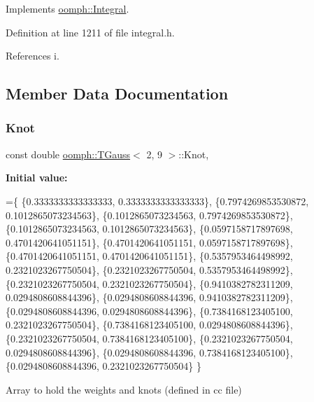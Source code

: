 Implements \hyperlink{classoomph_1_1Integral_ac65335e2aab120b285b3d6c294507b06}{oomph\+::\+Integral}.



Definition at line 1211 of file integral.\+h.



References i.



\subsection{Member Data Documentation}
\mbox{\label{classoomph_1_1TGauss_3_012_00_019_01_4_a65f7297373f3c25ff0616fde13fb4d65}} 
\subsubsection{\texorpdfstring{Knot}{Knot}}
{\footnotesize\ttfamily const double \hyperlink{classoomph_1_1TGauss}{oomph\+::\+T\+Gauss}$<$ 2, 9 $>$\+::Knot\hspace{0.3cm}{\ttfamily [static]}, {\ttfamily [private]}}

{\bfseries Initial value\+:}
\begin{DoxyCode}
=\{
 \{0.3333333333333333,  0.3333333333333333\},
 \{0.7974269853530872,  0.1012865073234563\},
 \{0.1012865073234563,  0.7974269853530872\},
 \{0.1012865073234563,  0.1012865073234563\},
 \{0.0597158717897698,  0.4701420641051151\},
 \{0.4701420641051151,  0.0597158717897698\},
 \{0.4701420641051151,  0.4701420641051151\},
 \{0.5357953464498992,  0.2321023267750504\},
 \{0.2321023267750504,  0.5357953464498992\},
 \{0.2321023267750504,  0.2321023267750504\},
 \{0.9410382782311209,  0.0294808608844396\},
 \{0.0294808608844396,  0.9410382782311209\},
 \{0.0294808608844396,  0.0294808608844396\},
 \{0.7384168123405100,  0.2321023267750504\},
 \{0.7384168123405100,  0.0294808608844396\},
 \{0.2321023267750504,  0.7384168123405100\},
 \{0.2321023267750504,  0.0294808608844396\},
 \{0.0294808608844396,  0.7384168123405100\},
 \{0.0294808608844396,  0.2321023267750504\}
 \}
\end{DoxyCode}


Array to hold the weights and knots (defined in cc file) 




